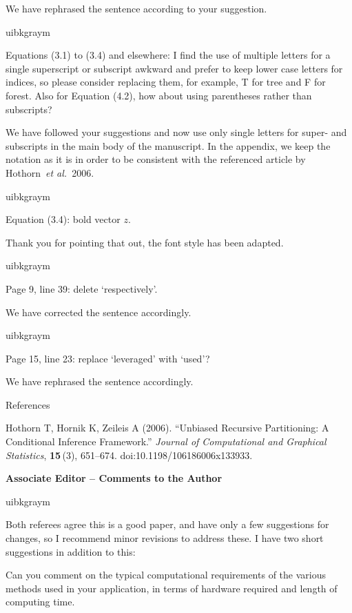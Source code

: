 \documentclass[english, noconfig]{uibklttr}
\newcommand{\section}[1]{{\Large{\textbf{#1}}}}
\newenvironment{re}{
    \begin{color}{uibkgraym}
        \itshape
}{
    \end{color}
}
\begin{document}
We have rephrased the sentence according to your suggestion.

\vspace{0.5em}
\begin{re}
Equations (3.1) to (3.4) and elsewhere: I find the use of multiple letters for a single superscript or subscript awkward and prefer to keep lower case letters for indices, so please consider replacing them, for example, T for tree and F for forest. Also for Equation (4.2), how about using parentheses rather than subscripts?
\end{re}

We have followed your suggestions and now use only single letters for super-
and subscripts in the main body of the manuscript. In the appendix, we keep the
notation as it is in order to be consistent with the referenced article by Hothorn~\emph{et al.}~2006.

\vspace{0.5em}
\begin{re}
Equation (3.4): bold vector $z$.
\end{re}

Thank you for pointing that out, the font style has been adapted.

\vspace{0.5em}
\begin{re}
Page 9, line 39: delete `respectively'.
\end{re}

We have corrected the sentence accordingly.

\vspace{0.5em}
\begin{re}
Page 15, line 23: replace `leveraged' with `used'?
\end{re}

We have rephrased the sentence accordingly.

\vspace{0.5cm}
References

Hothorn T, Hornik K, Zeileis A (2006). ``Unbiased Recursive Partitioning: A Conditional
Inference Framework.'' \emph{Journal of Computational and Graphical Statistics}, \textbf{15}\,(3), 651--674.
doi:10.1198/106186006x133933.

\newpage

\section{Associate Editor -- Comments to the Author}

\begin{re}
Both referees agree this is a good paper, and have only a few suggestions for
changes, so I recommend minor revisions to address these. I have two short suggestions in addition to this:

Can you comment on the typical computational requirements of the various
methods used in your application, in terms of hardware required and length of
computing time.
\end{re}
\end{document}
